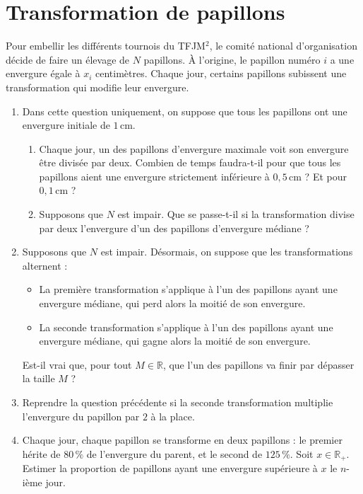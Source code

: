 \section{Transformation de papillons}

Pour embellir les différents tournois du TFJM$^2$, le comité national d'organisation décide de faire un élevage de $N$ papillons. À l'origine, le papillon numéro $i$ a une envergure égale à $x_i$ centimètres. Chaque jour, certains papillons subissent une transformation qui modifie leur envergure.

\begin{enumerate}
  \item Dans cette question uniquement, on suppose que tous les papillons ont une envergure initiale de $1\,\mathrm{cm}$.
  \begin{enumerate}
    \item Chaque jour, un des papillons d'envergure maximale voit son envergure être divisée par deux. Combien de temps faudra-t-il pour que tous les papillons aient une envergure strictement inférieure à $0,5\,\mathrm{cm}$ ? Et pour $0,1\,\mathrm{cm}$ ?
    \item Supposons que $N$ est impair. Que se passe-t-il si la transformation divise par deux l'envergure d'un des papillons d'envergure médiane ?
  \end{enumerate}

  \item Supposons que $N$ est impair. Désormais, on suppose que les transformations alternent :
  \begin{itemize}
    \item La première transformation s'applique à l'un des papillons ayant une envergure médiane, qui perd alors la moitié de son envergure.
    \item La seconde transformation s'applique à l'un des papillons ayant une envergure médiane, qui gagne alors la moitié de son envergure.
  \end{itemize}
  Est-il vrai que, pour tout $M \in \mathbb{R}$, que l'un des papillons va finir par dépasser la taille $M$ ?

  \item Reprendre la question précédente si la seconde transformation multiplie l'envergure du papillon par $2$ à la place.

  \item Chaque jour, chaque papillon se transforme en deux papillons : le premier hérite de $80\,\%$ de l'envergure du parent, et le second de $125\,\%$. Soit $x \in \mathbb{R}_+$. Estimer la proportion de papillons ayant une envergure supérieure à $x$ le $n$-ième jour.


\end{enumerate}
